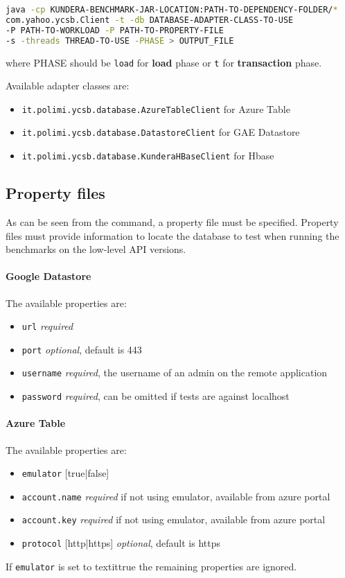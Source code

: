\begin{lstlisting}[language=bash, caption=Run low-level API benchmarks, numbers=none]
java -cp KUNDERA-BENCHMARK-JAR-LOCATION:PATH-TO-DEPENDENCY-FOLDER/*
com.yahoo.ycsb.Client -t -db DATABASE-ADAPTER-CLASS-TO-USE
-P PATH-TO-WORKLOAD -P PATH-TO-PROPERTY-FILE 
-s -threads THREAD-TO-USE -PHASE > OUTPUT_FILE
\end{lstlisting}

\noindent where PHASE should be \texttt{load} for \textbf{load} phase or \texttt{t} for \textbf{transaction} phase.

\newparagraph  Available adapter classes are:
\begin{itemize}
\item \texttt{it.polimi.ycsb.database.AzureTableClient} for Azure Table
\item \texttt{it.polimi.ycsb.database.DatastoreClient} for GAE Datastore
\item \texttt{it.polimi.ycsb.database.KunderaHBaseClient} for Hbase
\end{itemize}

\subsection{Property files}
As can be seen from the command, a property file must be specified. Property files must provide information to locate the database to test when running the benchmarks on the low-level API versions.

\paragraph{Google Datastore} The available properties are:
\begin{itemize}
\item \texttt{url} \textit{required}
\item \texttt{port} \textit{optional}, default is 443
\item \texttt{username} \textit{required}, the username of an admin on the remote application
\item \texttt{password} \textit{required}, can be omitted if tests are against localhost
\end{itemize}

\paragraph{Azure Table} The available properties are:
\begin{itemize}
\item \texttt{emulator} [true|false]
\item \texttt{account.name} \textit{required} if not using emulator, available from azure portal
\item \texttt{account.key} \textit{required} if not using emulator, available from azure portal
\item \texttt{protocol} [http|https] \textit{optional}, default is https
\end{itemize}
\noindent If \texttt{emulator} is set to textit{true} the remaining properties are ignored.

